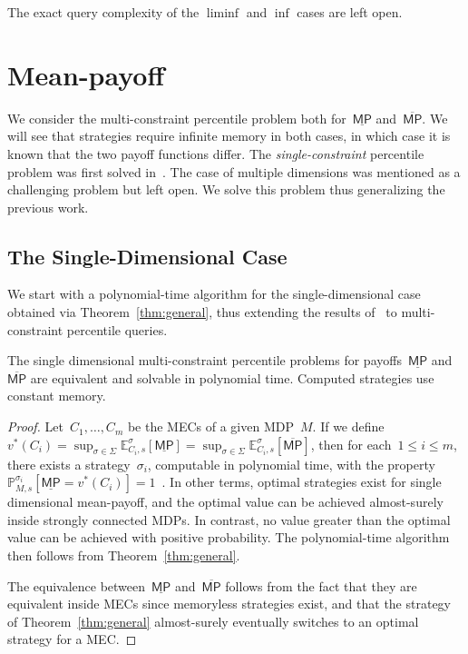 \documentclass{llncs}
\newcommand*{\pr}{\mathbb{P}}
\newcommand*{\mpsup}{\ensuremath{\overline{\mathsf{MP}}}}
\newcommand*{\mpinf}{\ensuremath{\underline{\mathsf{MP}}}}
\newcommand*{\expect}{\mathbb{E}}
\begin{document}
\noindent
The exact query complexity of the $\liminf$ and $\inf$ cases are left open. 

\section{Mean-payoff}
\label{section:mp}
We consider the multi-constraint percentile problem both for~$\mpinf$ and~$\mpsup$.
We will see that strategies require infinite memory in both cases, in which case
it is known that the two payoff functions differ.
The \emph{single-constraint} percentile problem was first solved in~\cite{FKR-ieee95}.
The case of multiple dimensions was mentioned as a challenging problem but left open.
We solve this problem thus generalizing the previous work. 

\subsection{The Single-Dimensional Case}

We start with a polynomial-time algorithm for the single-dimensional case
obtained via Theorem~\ref{thm:general}, thus extending the results of~\cite{FKR-ieee95} to multi-constraint percentile queries.

\begin{theorem}
  The single dimensional multi-constraint percentile problems for payoffs~$\mpinf$ and~$\mpsup$ are equivalent and solvable in polynomial time.
  Computed strategies use constant memory.
\end{theorem}

\begin{proof}
  Let~$C_1,\ldots,C_m$ be the MECs of a given MDP~$M$.
  If we define $v^*(C_i) = \sup_{\sigma \in \Sigma} \expect_{C_i,s}^\sigma[\mpinf] = \sup_{\sigma \in \Sigma}\expect_{C_i,s}^\sigma[\mpsup]$,
  then for each~$1\leq i\leq m$, there exists a strategy~$\sigma_i$, computable in polynomial time, with the property
  $\pr_{M,s}^{\sigma_i}[\mpinf = v^*(C_i)] = 1$~\cite{Puterman-wiley94}. In other terms, optimal strategies exist for single dimensional mean-payoff,
  and the optimal value can be achieved almost-surely inside strongly connected MDPs.
  In contrast,  no value greater than the optimal value can be achieved with positive probability. 
  The polynomial-time algorithm then follows from Theorem~\ref{thm:general}.

  The equivalence between~$\mpinf$ and~$\mpsup$ follows from the fact that they are equivalent inside MECs since
  memoryless strategies exist, and that the strategy of Theorem~\ref{thm:general} almost-surely eventually switches to 
  an optimal strategy for a MEC.
\end{proof}
\end{document}
